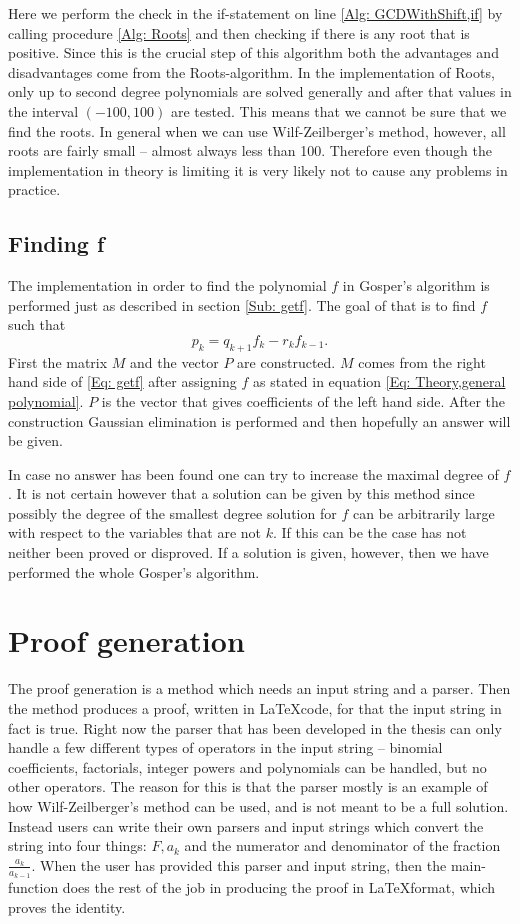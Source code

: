 Here we perform the check in the if-statement on line \ref{Alg: GCDWithShift,if} by calling procedure \ref{Alg: Roots} and then checking if there is any root that is positive. Since this is the crucial step of this algorithm both the advantages and disadvantages come from the Roots-algorithm. In the implementation of Roots, only up to second degree polynomials are solved generally and after that values in the interval $(-100,100)$ are tested. This means that we cannot be sure that we find the roots. In general when we can use Wilf-Zeilberger's method, however, all roots are fairly small -- almost always less than 100. Therefore even though the implementation in theory is limiting it is very likely not to cause any problems in practice.
\subsection{Finding f}
The implementation in order to find the polynomial $f$ in Gosper's algorithm is performed just as described in section \ref{Sub: getf}. The goal of that is to find $f$ such that
\begin{equation}\label{Eq: getf}
  p_k=q_{k+1}f_k-r_kf_{k-1}.
\end{equation}
First the matrix $M$ and the vector $P$ are constructed. $M$ comes from the right hand side of \ref{Eq: getf} after assigning $f$ as stated in equation \ref{Eq: Theory,general polynomial}. $P$ is the vector that gives coefficients of the left hand side. After the construction Gaussian elimination is performed and then hopefully an answer will be given.

In case no answer has been found one can try to increase the maximal degree of $f$. It is not certain however that a solution can be given by this method since possibly the degree of the smallest degree solution for $f$ can be arbitrarily large with respect to the variables that are not $k$. If this can be the case has not neither been proved or disproved. If a solution is given, however, then we have performed the whole Gosper's algorithm.
\section{Proof generation}
The proof generation is a method which needs an input string and a parser. Then the method produces a proof, written in \LaTeX code, for that the input string in fact is true. Right now the parser that has been developed in the thesis can only handle a few different types of operators in the input string -- binomial coefficients, factorials, integer powers and polynomials can be handled, but no other operators. The reason for this is that the parser mostly is an example of how Wilf-Zeilberger's method can be used, and is not meant to be a full solution. Instead users can write their own parsers and input strings which convert the string into four things: $F,a_k$ and the numerator and denominator of the fraction $\frac{a_k}{a_{k-1}}$. When the user has provided this parser and input string, then the main-function does the rest of the job in producing the proof in \LaTeX format, which proves the identity.

